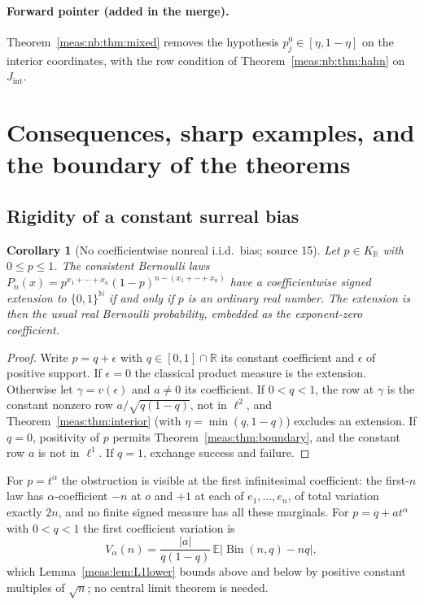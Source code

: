 \documentclass[11pt]{article}
\numberwithin{equation}{section}
\newtheorem{corollary}[theorem]{Corollary}
\theoremstyle{definition}
\theoremstyle{remark}
\newcommand{\R}{\mathbb R}
\newcommand{\N}{\mathbb N}
\newcommand{\KR}{K_{\R}}
\newcommand{\E}{\mathbb E}
\newcommand{\abs}[1]{\lvert#1\rvert}
\begin{document}
\paragraph{Forward pointer (added in the merge).} Theorem~\ref{meas:nb:thm:mixed}
removes the hypothesis $p_j^0\in[\eta,1-\eta]$ on the interior coordinates, with the
row condition of Theorem~\ref{meas:nb:thm:hahn} on $J_{\mathrm{int}}$.

\section{Consequences, sharp examples, and the boundary of the theorems}
\label{meas:sec:coef-examples}

\subsection{Rigidity of a constant surreal bias}

\begin{corollary}[No coefficientwise nonreal i.i.d.\ bias; source 15]
\label{meas:cor:iid}
Let $p\in\KR$ with $0\le p\le1$. The consistent Bernoulli laws
$P_n(x)=p^{x_1+\cdots+x_n}(1-p)^{n-(x_1+\cdots+x_n)}$ have a coefficientwise
signed extension to $\{0,1\}^{\N}$ if and only if $p$ is an ordinary real
number. The extension is then the usual real Bernoulli probability, embedded as
the exponent-zero coefficient.
\end{corollary}
\begin{proof}
Write $p=q+\epsilon$ with $q\in[0,1]\cap\R$ its constant coefficient and $\epsilon$ of
positive support. If $\epsilon=0$ the classical product measure is the extension.
Otherwise let $\gamma=v(\epsilon)$ and $a\ne0$ its coefficient. If $0<q<1$, the row at
$\gamma$ is the constant nonzero row $a/\sqrt{q(1-q)}$, not in $\ell^2$, and
Theorem~\ref{meas:thm:interior} (with $\eta=\min(q,1-q)$) excludes an extension.
If $q=0$, positivity of $p$ permits Theorem~\ref{meas:thm:boundary}, and the
constant row $a$ is not in $\ell^1$. If $q=1$, exchange success and failure.
\end{proof}

For $p=t^\alpha$ the obstruction is visible at the first infinitesimal
coefficient: the first-$n$ law has $\alpha$-coefficient $-n$ at $o$ and $+1$ at each
of $e_1,\ldots,e_n$, of total variation exactly $2n$, and no finite signed measure
has all these marginals. For $p=q+at^\alpha$ with $0<q<1$ the first coefficient
variation is
\begin{equation}\label{meas:eq:binomial-variation}
 V_\alpha(n)=\frac{\abs a}{q(1-q)}\,\E\bigl\lvert\operatorname{Bin}(n,q)-nq\bigr\rvert ,
\end{equation}
which Lemma~\ref{meas:lem:L1lower} bounds above and below by positive constant
multiples of $\sqrt n$; no central limit theorem is needed.
\end{document}
